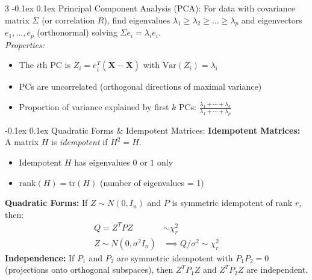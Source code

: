 \documentclass[10pt]{article}
\makeatletter
\renewcommand{\section}{\@startsection{section}{1}{0mm}
  {-0.1ex}%
  {0.1ex}%
  {\normalfont\normalsize\bfseries\color{thm-color}}}
\newcommand{\vect}[1]{\symbf{#1}} %
\makeatother
\begin{document}
\begin{multicols}{3}
  \section{Principal Component Analysis (PCA):}
  For data with covariance matrix \( \Sigma \) (or correlation \( R \)), find eigenvalues \( \lambda_1\ge\lambda_2\ge\dots\ge\lambda_p \) and eigenvectors \( e_1,\dots,e_p \) (orthonormal) solving \( \Sigma e_i=\lambda_i e_i. \)\\[0em]
  \textit{Properties:}
  \begin{itemize}[left=0pt,labelsep=1pt,itemsep=0pt]
    \item The \( i \)th PC is \( Z_i = e_i^T (\vect{X}-\bar{\vect{X}}) \) with \( \mathrm{Var}(Z_i)=\lambda_i \)
    \item PCs are uncorrelated (orthogonal directions of maximal variance)
    \item Proportion of variance explained by first \( k \) PCs: \( \frac{\lambda_1+\cdots+\lambda_k}{\lambda_1+\cdots+\lambda_p} \)
  \end{itemize}
  \section{Quadratic Forms \& Idempotent Matrices:}
  \textbf{Idempotent Matrices:} A matrix \( H \) is \textit{idempotent} if \( H^2=H \).
  \begin{itemize}[left=0pt,labelsep=1pt,itemsep=0pt]
    \item Idempotent \( H \) has eigenvalues \( 0 \) or \( 1 \) only
    \item \( \mathrm{rank}(H)=\mathrm{tr}(H) \) (number of eigenvalues = 1)
  \end{itemize}
  \textbf{Quadratic Forms:} If \( Z\sim N(0,I_n) \) and \( P \) is symmetric idempotent of rank \( r \), then:
  \begin{align*}
    Q=Z^T P Z               & \sim \chi^2_{r}                     \\
    Z\sim N(0,\sigma^2 I_n) & \implies Q/\sigma^2 \sim \chi^2_{r}
  \end{align*}
  \textbf{Independence:} If \( P_1 \) and \( P_2 \) are symmetric idempotent with \( P_1 P_2 = 0 \) (projections onto orthogonal subspaces), then \( Z^T P_1 Z \) and \( Z^T P_2 Z \) are independent.

\end{multicols}
\end{document}
